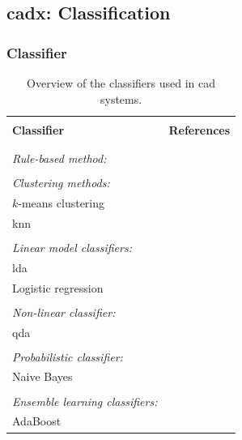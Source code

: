 \subsection{\Ac{cadx}: Classification} \label{subsec:chp3:img-clas:CADX-clas}

\subsubsection{Classifier} \label{subsubsec:chp3:img-clas:CADX-clas:clas}

\begin{table}
  \caption{Overview of the classifiers used in \ac{cad} systems.}
  \small
  \renewcommand{\arraystretch}{.8}
  \begin{tabular}{p{.60\linewidth} p{.30\linewidth}}
    \hline \\ [-1.5ex]
    \textbf{Classifier} & \textbf{References} \\ \\ [-1.5ex]
    \hline \\ [-1.5ex]
    \textit{Rule-based method:} & \cite{Lv2009,Puech2009} \\ \\ [-1.5ex]
    \textit{Clustering methods:} & \\
    \quad $k$-means clustering & \cite{Tiwari2007,Tiwari2008,Tiwari2009} \\
    \quad \acs{knn} & \cite{Litjens2012,Niaf2011,Niaf2012} \\ \\ [-1.5ex]
    \textit{Linear model classifiers:} & \\
    \quad \acs{lda} & \cite{Antic2013,Chan2003,Litjens2014,Niaf2011,Niaf2012,Vos2012} \\
    \quad Logistic regression & \cite{Kelm2007,Langer2009} \\ \\ [-1.5ex]
    \textit{Non-linear classifier:} & \\
    \quad \acs{qda} & \cite{Viswanath2012} \\ \\ [-1.5ex]
    \textit{Probabilistic classifier:} & \\
    \quad Naive Bayes & \cite{Giannini2013,Mazzetti2011,Niaf2011,Niaf2012} \\ \\ [-1.5ex]
    \textit{Ensemble learning classifiers:} & \\
    \quad AdaBoost & \cite{Litjens2014,Lopes2011} \\

\end{tabular}
\end{table}
